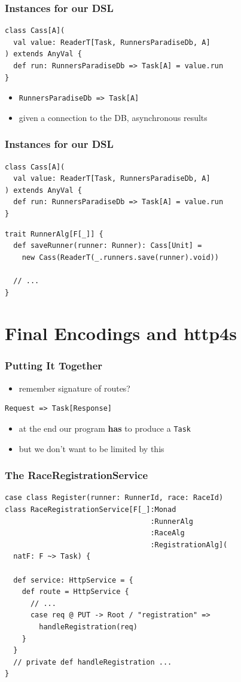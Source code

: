 \documentclass{beamer}
\begin{document}
\begin{frame}
  \frametitle{Instances for our DSL}
\begin{verbatim}
class Cass[A](
  val value: ReaderT[Task, RunnersParadiseDb, A]
) extends AnyVal {
  def run: RunnersParadiseDb => Task[A] = value.run
}
\end{verbatim}
  \begin{itemize}
  \item \texttt{RunnersParadiseDb => Task[A]}
  \item given a connection to the DB, asynchronous results
  \end{itemize}
\end{frame}

\begin{frame}
  \frametitle{Instances for our DSL}
\begin{verbatim}
class Cass[A](
  val value: ReaderT[Task, RunnersParadiseDb, A]
) extends AnyVal {
  def run: RunnersParadiseDb => Task[A] = value.run
}
\end{verbatim}
  \vfill
\begin{verbatim}
trait RunnerAlg[F[_]] {
  def saveRunner(runner: Runner): Cass[Unit] =
    new Cass(ReaderT(_.runners.save(runner).void))

  // ...
}
\end{verbatim}
\end{frame}

\section{Final Encodings and http4s}

\begin{frame}[fragile]
  \frametitle{Putting It Together}
  \begin{itemize}
  \item remember signature of routes?
  \end{itemize}
\begin{verbatim}
Request => Task[Response]
\end{verbatim}
  \begin{itemize}
  \item at the end our program \textbf{has} to produce a \texttt{Task}
  \item but we don't want to be limited by this
  \end{itemize}
\end{frame}

\begin{frame}[fragile]
  \frametitle{The RaceRegistrationService}
\begin{verbatim}
case class Register(runner: RunnerId, race: RaceId)
class RaceRegistrationService[F[_]:Monad
                                  :RunnerAlg
                                  :RaceAlg
                                  :RegistrationAlg](
  natF: F ~> Task) {

  def service: HttpService = {
    def route = HttpService {
      // ...
      case req @ PUT -> Root / "registration" =>
        handleRegistration(req)
    }
  }
  // private def handleRegistration ...
}
\end{verbatim}
\end{frame}
\end{document}
